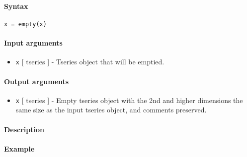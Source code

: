 


	\paragraph{Syntax}

\begin{verbatim}
x = empty(x)
\end{verbatim}

\paragraph{Input arguments}

\begin{itemize}
\itemsep1pt\parskip0pt
\item
  \texttt{x} {[} tseries {]} - Tseries object that will be emptied.
\end{itemize}

\paragraph{Output arguments}

\begin{itemize}
\itemsep1pt\parskip0pt
\item
  \texttt{x} {[} tseries {]} - Empty tseries object with the 2nd and
  higher dimensions the same size as the input tseries object, and
  comments preserved.
\end{itemize}

\paragraph{Description}

\paragraph{Example}


